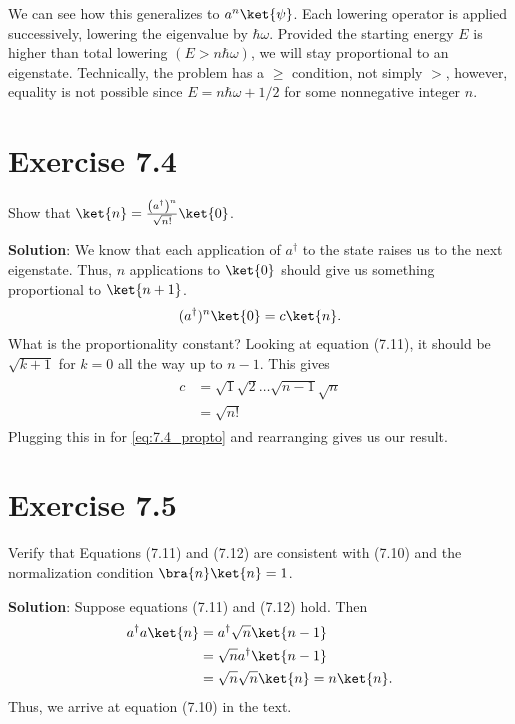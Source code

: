 \documentclass{book}
\begin{document}
    We can see how this generalizes to $a^n \ket{\psi}$. Each lowering operator is applied successively, lowering the eigenvalue by $\hbar \omega$. Provided the starting energy $E$ is higher than total lowering $(E > n \hbar \omega)$, we will stay proportional to an eigenstate. Technically, the problem has a $\geq$ condition, not simply $>$, however, equality is not possible since $E = n\hbar \omega + 1/2$ for some nonnegative integer $n$.

\section*{Exercise 7.4}
    Show that $\ket{n} = \frac{\left(a^\dagger\right)^n}{\sqrt{n!}} \ket{0}$.

    \textbf{Solution}: We know that each application of $a^\dagger$ to the state raises us to the next eigenstate. Thus, $n$ applications to $\ket{0}$ should give us something proportional to $\ket{n+1}$.
    \begin{align} \label{eq:7.4_propto}
        (a^\dagger)^n \ket{0} = c \ket{n}.
    \end{align}
    What is the proportionality constant? Looking at equation (7.11), it should be $\sqrt{k+1}$ for $k = 0$ all the way up to $n-1$. This gives
    \begin{align}
    \begin{aligned}
        c &= \sqrt{1}\sqrt{2} \dots \sqrt{n-1} \sqrt{n} \\
        &= \sqrt{n!}
    \end{aligned}
    \end{align}
    Plugging this in for \eqref{eq:7.4_propto} and rearranging gives us our result.

\section*{Exercise 7.5}
    Verify that Equations (7.11) and (7.12) are consistent with (7.10) and the normalization condition $\bra{n}\ket{n} = 1$.

    \textbf{Solution}: Suppose equations (7.11) and (7.12) hold. Then
    \begin{align}
    \begin{aligned}
        a^\dagger a \ket{n} &= a^\dagger \sqrt{n}\ket{n-1} \\
        &= \sqrt{n} a^\dagger \ket{n-1} \\
        &= \sqrt{n} \sqrt{n} \ket{n} = n \ket{n}.
    \end{aligned}
    \end{align}
    Thus, we arrive at equation (7.10) in the text.
    
\end{document}
